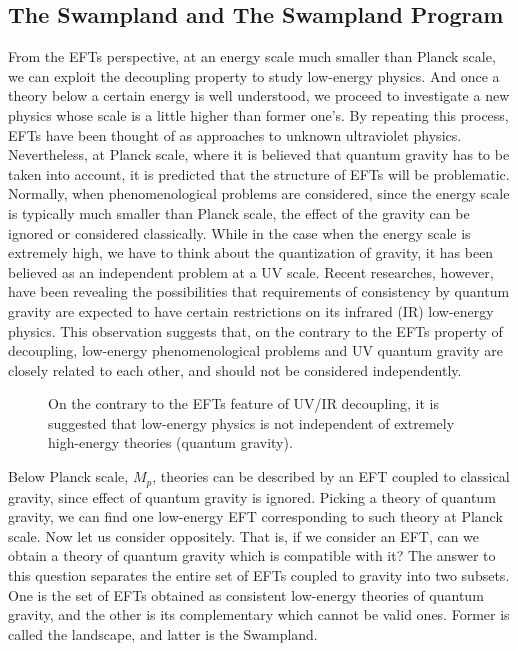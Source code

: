 \subsection{The Swampland and The Swampland Program}
From the EFTs perspective, at an energy scale much smaller than Planck scale, we can exploit the decoupling property to study low-energy physics. And once a theory below a certain energy is well understood, we proceed to investigate a new physics whose scale is a little higher than former one's. By repeating this process, EFTs have been thought of as approaches to unknown ultraviolet physics. Nevertheless, at Planck scale, where it is believed that quantum gravity has to be taken into account, it is predicted that the structure of EFTs will be problematic. Normally, when phenomenological problems are considered, since the energy scale is typically much smaller than Planck scale, the effect of the gravity can be ignored or considered classically. While in the case when the energy scale is extremely high, we have to think about the quantization of gravity, it has been believed as an independent problem at a UV scale. Recent researches, however, have been revealing the possibilities that requirements of consistency by quantum gravity are expected to have certain restrictions on its infrared (IR) low-energy physics. This observation suggests that, on the contrary to the EFTs property of decoupling, low-energy phenomenological problems and UV quantum gravity are closely related to each other, and should not be considered independently.
\begin{figure}
    \centering
    \caption{On the contrary to the EFTs feature of UV/IR decoupling, it is suggested that low-energy physics is not independent of extremely high-energy theories (quantum gravity).}
    \label{fig:UV/IR mixing}
\end{figure}
Below Planck scale, $M_{p}$, theories can be described by an EFT coupled to classical gravity, since effect of quantum gravity is ignored. Picking a theory of quantum gravity, we can find one low-energy EFT corresponding to such theory at Planck scale. Now let us consider oppositely. That is, if we consider an EFT, can we obtain a theory of quantum gravity which is compatible with it? The answer to this question separates the entire set of EFTs coupled to gravity into two subsets. One is the set of EFTs obtained as consistent low-energy theories of quantum gravity, and the other is its complementary which cannot be valid ones. Former is called the landscape, and latter is the Swampland.

